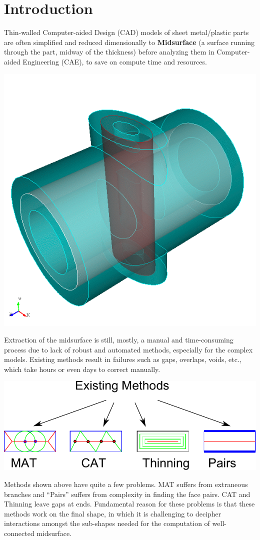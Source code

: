 \section{Introduction}
Thin-walled Computer-aided Design (CAD) models of sheet metal/plastic parts are often simplified and reduced dimensionally to \textbf{Midsurface} (a surface running through the part, midway of the thickness) before analyzing them in Computer-aided Engineering (CAE), to save on compute time and resources. 
\begin{center}
\includegraphics[width=0.7\linewidth]{../Common/images/MidsurfaceTitle}
\end{center}

Extraction of the midsurface is still, mostly, a manual and time-consuming process due to lack of robust and automated methods, especially for the complex models. Existing methods result in failures such as gaps, overlaps, voids, etc., which take hours or even days to correct manually. 

\begin{center}
\includegraphics[width=0.9\linewidth]{../Common/images/MedialMethodsOnly.pdf}
\end{center}

Methods shown above have quite a few problems. MAT suffers from extraneous branches and ``Pairs'' suffers from complexity in finding the face pairs. CAT and Thinning leave gaps at ends. 
Fundamental reason for these problems is that these methods work on the final shape, in which it is challenging to decipher interactions amongst the sub-shapes needed for the computation of well-connected midsurface.


